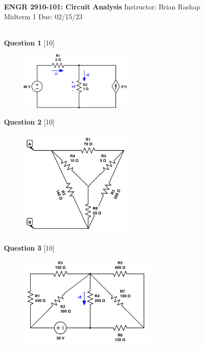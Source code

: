 \documentclass[12pt]{article}
\begin{document}
\begin{center}
\hfil
{\large\bf {ENGR 2910-101: Circuit Analysis}}
\hfill Instructor: Brian Rashap\\
Midterm 1  \hfill Due: 02/15/23\\
\hrulefill\\
\end{center}

{\bf Question 1} [10] %



\begin{figure}[h!]
\centering 
\includegraphics[clip,width=0.49\textwidth]{mid1_1.png}
\end{figure}

{\bf Question 2} [10] %

\begin{figure}[h!]
  \centering 
 \vspace{-0.1in}
 \includegraphics[clip,width=0.49\textwidth]{mid1_2.jpg}
\vspace{-0.1in}
\end{figure}


\newpage
{\bf Question 3} [10] %

\begin{figure}[h!]
     \centering
\vspace{-0.1in}
       \includegraphics[clip,width=0.6\textwidth]{mid1_4.jpg}
\vspace{-0.15in}
\end{figure}
\end{document}
